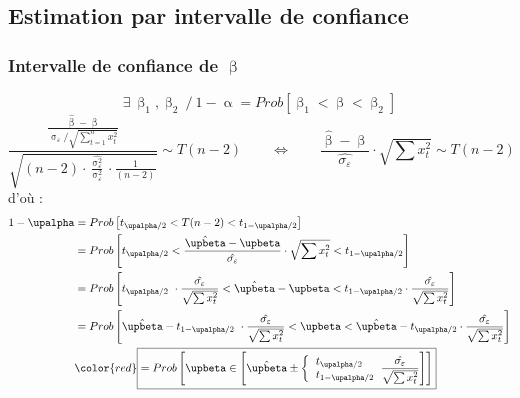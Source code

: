 \documentclass{article}
\newcommand{\hbeta}{\hat{\upbeta}}
\newcommand{\sumt}{\sum\limits_{t=1}^n}
\newcommand{\sig}{\upsigma_\varepsilon^2}
\newcommand{\studn}{t_{\upalpha / 2}}
\newcommand{\studp}{t_{1 - \upalpha / 2}}
\begin{document}
\subsection{Estimation par intervalle de confiance}
\subsubsection{ Intervalle de confiance de \(\upbeta\)}
\[\exists \: \upbeta_1, \upbeta_2 \: /  \: 1 - \upalpha = Prob [\upbeta_1 < \upbeta < \upbeta_2]\]
\[\frac{\frac{\hbeta - \upbeta}{\upsigma_\varepsilon / \sqrt{\sumt x_t^2}}}{\sqrt{(n-2) \cdot \frac{\hat{\sig}}{\sig} \cdot \frac{1}{(n-2)}}} \sim T(n-2) \qquad \Leftrightarrow \qquad \frac{\hbeta - \upbeta}{\hat{\sigma_\varepsilon}} \cdot \sqrt{\sum x_t^2} \sim T(n-2) \]
d'où : 
\begin{align*}
	1- \upalpha &= Prob\left[\studn < T(n-2) <\studp\right] \\
	&= Prob\left[\studn< \frac{\hbeta - \upbeta}{\hat{\sigma_\varepsilon}} \cdot \sqrt{\sum x_t^2}<\studp\right] \\		&= Prob\left[\studn\ \cdot \frac{\hat{\sigma_\varepsilon}}{\sqrt{\sum x_t^2}} < \hbeta - \upbeta <\studp \cdot \frac{\hat{\sigma_\varepsilon}}{\sqrt{\sum x_t^2}} \right] \\
	&=  Prob\left[\hbeta - \studp\ \cdot \frac{\hat{\sigma_\varepsilon}}{\sqrt{\sum x_t^2}} <\upbeta <\hbeta - \studn \cdot \frac{\hat{\sigma_\varepsilon}}{\sqrt{\sum x_t^2}} \right] \\
	&{\color{red} \boxed{= Prob\left[\upbeta \in \left[\hbeta \pm \bigg\{\begin{tabular}{l} $\studn$ \\ $\studp$ \end{tabular}  \frac{\hat{\sigma_\varepsilon}}{\sqrt{\sum x_t^2}}  \right]\right]}}
\end{align*}
\end{document}
